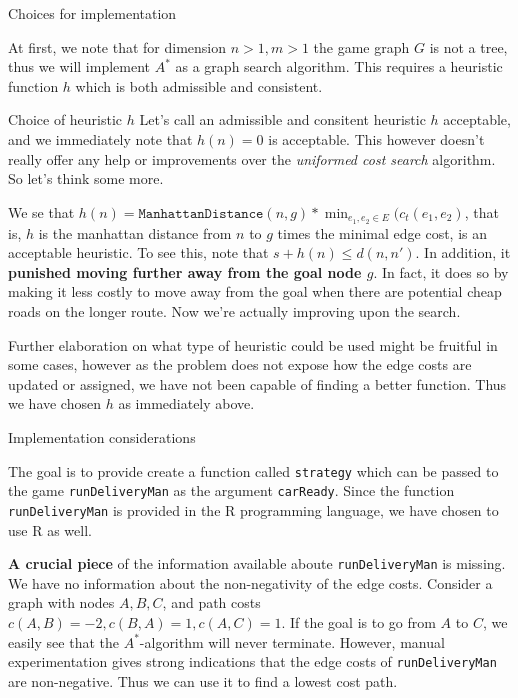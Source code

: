   \begin{subsection}{Choices for implementation}

    At first, we note that for dimension $n > 1, m > 1$ the game graph $G$ is not a tree, thus we will implement $A^*$ as a graph search algorithm. This requires a heuristic function $h$ which is both admissible and consistent.

    \begin{subsubsection}{Choice of heuristic $h$}
      Let's call an admissible and consitent heuristic $h$ acceptable, and we immediately note that $h(n) = 0$ is acceptable. This however doesn't really offer any help or improvements over the \textit{uniformed cost search} algorithm. So let's think some more.

      We se that $h(n) = \texttt{ManhattanDistance}(n, g) * \min_{e_1, e_2\in E}(c_t(e_1, e_2)$, that is, $h$ is the manhattan distance from $n$ to $g$ times the minimal edge cost, is an acceptable heuristic. To see this, note that $s + h(n) \leq d(n, n')$. In addition, it \textbf{punished moving further away from the goal node $g$}. In fact, it does so by making it less costly to move away from the goal when there are potential cheap roads on the longer route. Now we're actually improving upon the search.

      Further elaboration on what type of heuristic could be used might be fruitful in some cases, however as the problem does not expose how the edge costs are updated or assigned, we have not been capable of finding a better function. Thus we have chosen $h$ as immediately above.
    \end{subsubsection}
    
    \begin{subsubsection}{Implementation considerations}

      The goal is to provide create a function called \texttt{strategy} which can be passed to the game \texttt{runDeliveryMan} as the argument \texttt{carReady}. Since the function \texttt{runDeliveryMan} is provided in the R programming language, we have chosen to use R as well. 

      \textbf{A crucial piece} of the information available aboute \texttt{runDeliveryMan} is missing. We have no information about the non-negativity of the edge costs. Consider a graph with nodes $A, B, C$, and path costs $c(A, B) = -2, c(B, A) = 1, c(A, C) = 1$. If the goal is to go from $A$ to $C$, we easily see that the $A^*$-algorithm will never terminate. However, manual experimentation gives strong indications that the edge costs of \texttt{runDeliveryMan} are non-negative. Thus we can use it to find a lowest cost path. 


\end{subsubsection}
\end{subsection}
